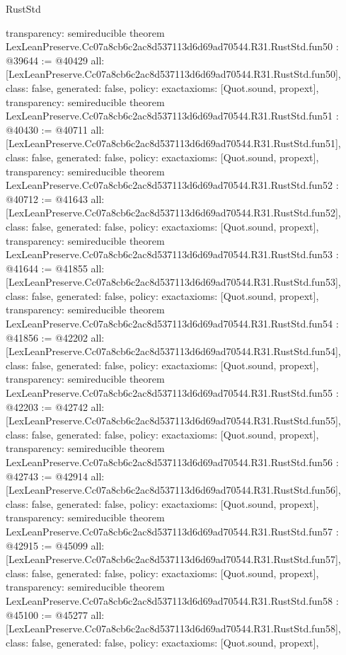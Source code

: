 \begin{lexlean}{RustStd}
\begin{coremodule}
{  transparency: semireducible
}
theorem LexLeanPreserve.Cc07a8cb6c2ac8d537113d6d69ad70544.R31.RustStd.fun50 : @39644 := @40429 {
  all: [LexLeanPreserve.Cc07a8cb6c2ac8d537113d6d69ad70544.R31.RustStd.fun50],
  class: false,
  generated: false,
  policy: exact{axioms: [Quot.sound, propext]},
  transparency: semireducible
}
theorem LexLeanPreserve.Cc07a8cb6c2ac8d537113d6d69ad70544.R31.RustStd.fun51 : @40430 := @40711 {
  all: [LexLeanPreserve.Cc07a8cb6c2ac8d537113d6d69ad70544.R31.RustStd.fun51],
  class: false,
  generated: false,
  policy: exact{axioms: [Quot.sound, propext]},
  transparency: semireducible
}
theorem LexLeanPreserve.Cc07a8cb6c2ac8d537113d6d69ad70544.R31.RustStd.fun52 : @40712 := @41643 {
  all: [LexLeanPreserve.Cc07a8cb6c2ac8d537113d6d69ad70544.R31.RustStd.fun52],
  class: false,
  generated: false,
  policy: exact{axioms: [Quot.sound, propext]},
  transparency: semireducible
}
theorem LexLeanPreserve.Cc07a8cb6c2ac8d537113d6d69ad70544.R31.RustStd.fun53 : @41644 := @41855 {
  all: [LexLeanPreserve.Cc07a8cb6c2ac8d537113d6d69ad70544.R31.RustStd.fun53],
  class: false,
  generated: false,
  policy: exact{axioms: [Quot.sound, propext]},
  transparency: semireducible
}
theorem LexLeanPreserve.Cc07a8cb6c2ac8d537113d6d69ad70544.R31.RustStd.fun54 : @41856 := @42202 {
  all: [LexLeanPreserve.Cc07a8cb6c2ac8d537113d6d69ad70544.R31.RustStd.fun54],
  class: false,
  generated: false,
  policy: exact{axioms: [Quot.sound, propext]},
  transparency: semireducible
}
theorem LexLeanPreserve.Cc07a8cb6c2ac8d537113d6d69ad70544.R31.RustStd.fun55 : @42203 := @42742 {
  all: [LexLeanPreserve.Cc07a8cb6c2ac8d537113d6d69ad70544.R31.RustStd.fun55],
  class: false,
  generated: false,
  policy: exact{axioms: [Quot.sound, propext]},
  transparency: semireducible
}
theorem LexLeanPreserve.Cc07a8cb6c2ac8d537113d6d69ad70544.R31.RustStd.fun56 : @42743 := @42914 {
  all: [LexLeanPreserve.Cc07a8cb6c2ac8d537113d6d69ad70544.R31.RustStd.fun56],
  class: false,
  generated: false,
  policy: exact{axioms: [Quot.sound, propext]},
  transparency: semireducible
}
theorem LexLeanPreserve.Cc07a8cb6c2ac8d537113d6d69ad70544.R31.RustStd.fun57 : @42915 := @45099 {
  all: [LexLeanPreserve.Cc07a8cb6c2ac8d537113d6d69ad70544.R31.RustStd.fun57],
  class: false,
  generated: false,
  policy: exact{axioms: [Quot.sound, propext]},
  transparency: semireducible
}
theorem LexLeanPreserve.Cc07a8cb6c2ac8d537113d6d69ad70544.R31.RustStd.fun58 : @45100 := @45277 {
  all: [LexLeanPreserve.Cc07a8cb6c2ac8d537113d6d69ad70544.R31.RustStd.fun58],
  class: false,
  generated: false,
  policy: exact{axioms: [Quot.sound, propext]},
}
\end{coremodule}
\end{lexlean}
